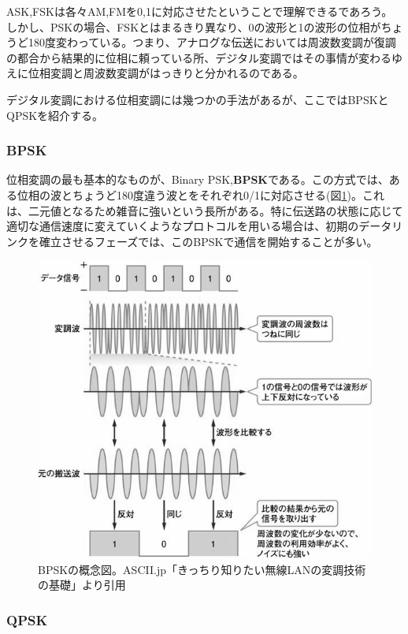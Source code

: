 ASK,FSKは各々AM,FMを0,1に対応させたということで理解できるであろう。しかし、PSKの場合、FSKとはまるきり異なり、0の波形と1の波形の位相がちょうど180度変わっている。つまり、アナログな伝送においては周波数変調が復調の都合から結果的に位相に頼っている所、デジタル変調ではその事情が変わるゆえに位相変調と周波数変調がはっきりと分かれるのである。

デジタル変調における位相変調には幾つかの手法があるが、ここではBPSKとQPSKを紹介する。

\subsubsection{BPSK}

位相変調の最も基本的なものが、Binary PSK,\textbf{BPSK}である。この方式では、ある位相の波とちょうど180度違う波とをそれぞれ0/1に対応させる(図\ref{fig6_5})。これは、二元値となるため雑音に強いという長所がある。特に伝送路の状態に応じて適切な通信速度に変えていくようなプロトコルを用いる場合は、初期のデータリンクを確立させるフェーズでは、このBPSKで通信を開始することが多い。

\begin{figure}[htb]
\centering
\includegraphics[width=0.9\linewidth,keepaspectratio,bb=0 0 588 524]{fig/fig6_5.jpg}
\caption{BPSKの概念図。ASCII.jp「きっちり知りたい無線LANの変調技術の基礎」より引用}\label{fig6_5}
\end{figure}

\subsubsection{QPSK}

